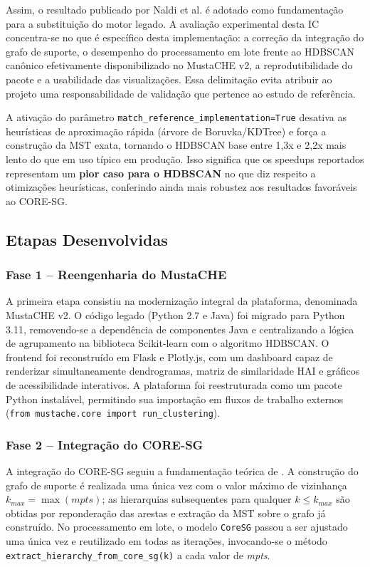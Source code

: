 \documentclass[12pt,a4paper,oneside]{article}
\begin{document}
Assim, o resultado publicado por Naldi et al. é adotado como fundamentação para a substituição
do motor legado. A avaliação experimental desta IC concentra-se no que é específico desta
implementação: a correção da integração do grafo de suporte, o desempenho do processamento em
lote frente ao HDBSCAN canônico efetivamente disponibilizado no MustaCHE v2, a reprodutibilidade
do pacote e a usabilidade das visualizações. Essa delimitação evita atribuir ao projeto uma
responsabilidade de validação que pertence ao estudo de referência.

A ativação do parâmetro \texttt{match\_reference\_implementation=True} desativa as heurísticas
de aproximação rápida (árvore de Boruvka/KDTree) e força a construção da MST exata, tornando o
HDBSCAN base entre 1,3x e 2,2x mais lento do que em uso típico em produção. Isso significa que
os speedups reportados representam um \textbf{pior caso para o HDBSCAN} no que diz respeito a
otimizações heurísticas, conferindo ainda mais robustez aos resultados favoráveis ao CORE-SG.

\subsection{Etapas Desenvolvidas}

\subsubsection{Fase 1 -- Reengenharia do MustaCHE}

A primeira etapa consistiu na modernização integral da plataforma, denominada MustaCHE v2. O
código legado (Python 2.7 e Java) foi migrado para Python 3.11, removendo-se a dependência de
componentes Java e centralizando a lógica de agrupamento na biblioteca Scikit-learn com o
algoritmo HDBSCAN. O frontend foi reconstruído em Flask e Plotly.js, com um dashboard capaz de
renderizar simultaneamente dendrogramas, matriz de similaridade HAI e gráficos de
acessibilidade interativos. A plataforma foi reestruturada como um pacote Python instalável,
permitindo sua importação em fluxos de trabalho externos (\texttt{from mustache.core import
run\_clustering}).

\subsubsection{Fase 2 -- Integração do CORE-SG}

A integração do CORE-SG seguiu a fundamentação teórica de \textcite{naldi2022coresg}. A
construção do grafo de suporte é realizada uma única vez com o valor máximo de vizinhança
$k_{max} = \max(mpts)$; as hierarquias subsequentes para qualquer $k \le k_{max}$ são obtidas
por reponderação das arestas e extração da MST sobre o grafo já construído. No processamento em
lote, o modelo \texttt{CoreSG} passou a ser ajustado uma única vez e reutilizado em todas as
iterações, invocando-se o método \texttt{extract\_hierarchy\_from\_core\_sg(k)} a cada valor de
\textit{mpts}.
\end{document}
